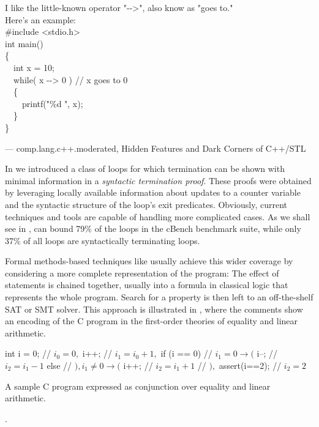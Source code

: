 \epigraph{\ttfamily
I like the little-known operator "-{}->", also know as "goes to."\\[\baselineskip]
Here's an example:\\[\baselineskip]
\#include <stdio.h>\\
int main()\\
\{\\
~~int x = 10;\\
~~while( x -{}-> 0 ) // x goes to 0\\
~~\{\\
~~~~printf("\%d ", x);\\
~~\}\\
\}%
}{--- \textup{comp.lang.c++.moderated}, Hidden Features and Dark Corners of C++/STL}

In  we introduced a class of loops for which termination can be shown with minimal information in a \emph{syntactic termination proof}. These proofs were obtained by leveraging locally available information about updates to a counter variable and the syntactic structure of the loop's exit predicates. Obviously, current techniques and tools are capable of handling more complicated cases. As we shall see in , \loopus{} can bound 79\% of the loops in the cBench benchmark suite, while only 37\% of all loops are syntactically terminating loops.

Formal methods-based techniques like \loopus{} usually achieve this wider coverage by considering a more complete representation of the program: The effect of statements is chained together, usually into a formula in classical logic that represents the whole program. Search for a property is then left to an off-the-shelf SAT or SMT solver. This approach is illustrated in , where the comments show an encoding of the C program in the first-order theories of equality and linear arithmetic.

\begin{listing}
    \begin{ccode}
int i = 0;      // $i_0 = 0,$
i++;            // $i_1 = i_0 + 1,$
if (i == 0) {   // $i_1 = 0 \rightarrow ($
    i--;        // $     i_2 = i_1 - 1$
} else {        // $), i_1 \ne 0 \rightarrow ($
    i++;        // $     i_2 = i_1 + 1$
}               // $),$
assert(i==2);   // $i_2 = 2$
    \end{ccode}
    \caption{A sample C program expressed as conjunction over equality and linear arithmetic.}
    \label{lst:ssa}.
\end{listing}

